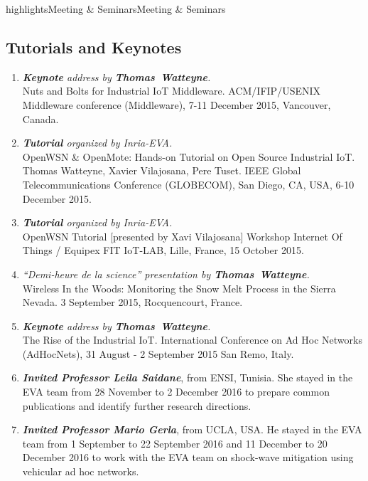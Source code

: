\documentclass{ra2016}
\newcommand{\thomas}  {\textbf{Thomas~Watteyne}}
\begin{document}
\begin{module}{highlights}{Meeting \& Seminars}{Meeting \& Seminars}
\label{sec:meetingseminars}

\subsection{Tutorials and Keynotes}
\begin{enumerate}
    \item \textit{\textbf{Keynote} address by \thomas.}\\
        Nuts and Bolts for Industrial IoT Middleware. ACM/IFIP/USENIX Middleware conference (Middleware), 7-11 December 2015, Vancouver, Canada.
    \item \textit{\textbf{Tutorial} organized by Inria-EVA.}\\
        OpenWSN \& OpenMote: Hands-on Tutorial on Open Source Industrial IoT. Thomas Watteyne, Xavier Vilajosana, Pere Tuset. IEEE Global Telecommunications Conference (GLOBECOM), San Diego, CA, USA, 6-10 December 2015.
    \item \textit{\textbf{Tutorial} organized by Inria-EVA.}\\
        OpenWSN Tutorial [presented by Xavi Vilajosana] Workshop Internet Of Things / Equipex FIT IoT-LAB, Lille, France, 15 October 2015.
    \item \textit{``Demi-heure de la science'' presentation by \thomas.}\\
        Wireless In the Woods: Monitoring the Snow Melt Process in the Sierra Nevada. 3 September 2015, Rocquencourt, France.
    \item \textit{\textbf{Keynote} address by \thomas.}\\
        The Rise of the Industrial IoT. International Conference on Ad Hoc Networks (AdHocNets), 31 August - 2 September 2015 San Remo, Italy.

    \item \textit{\textbf{Invited Professor Leila Saidane}}, from ENSI, Tunisia. She stayed in the EVA team from  28 November to 2 December 2016 to prepare common publications and identify further research directions.
    
       \item \textit{\textbf{Invited Professor Mario Gerla}}, from UCLA, USA. He stayed in the EVA team from 1  September to 22 September 2016 and 11 December to 20 December 2016 to work with the EVA team on shock-wave mitigation using vehicular ad hoc networks. 
    

\end{enumerate}
\end{module}
\end{document}
